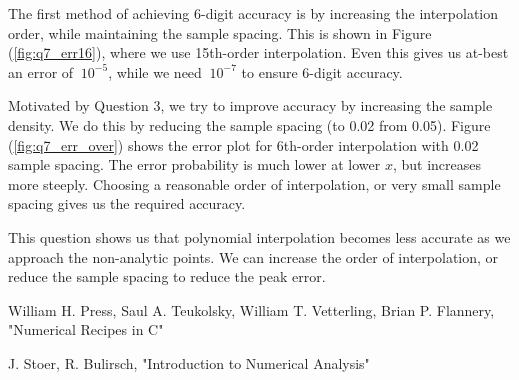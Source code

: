 \documentclass[11pt]{article}
\begin{document}
The first method of achieving 6-digit accuracy is by increasing the interpolation order, while maintaining the sample spacing. 
This is shown in Figure (\ref{fig:q7_err16}), where we use 15th-order interpolation. Even this gives us at-best an error of $~10^{-5}$, while we need $~10^{-7}$ to ensure 6-digit accuracy.

Motivated by Question 3, we try to improve accuracy by increasing the sample density. We do this by reducing the sample spacing (to 0.02 from 0.05). Figure (\ref{fig:q7_err_over}) shows the error plot for 6th-order interpolation with 0.02 sample spacing. The error probability is much lower at lower $x$, but increases more steeply. Choosing a reasonable order of interpolation, or very small sample spacing gives us the required accuracy. 

This question shows us that polynomial interpolation becomes less accurate as we approach the non-analytic points. We can increase the order of interpolation, or reduce the sample spacing to reduce the peak error. 
\begin{thebibliography}{155}
William H. Press, Saul A. Teukolsky, William T. Vetterling, Brian P. Flannery, "Numerical Recipes in C" 

J. Stoer, R. Bulirsch, "Introduction to Numerical Analysis"

\end{thebibliography}
\end{document}
